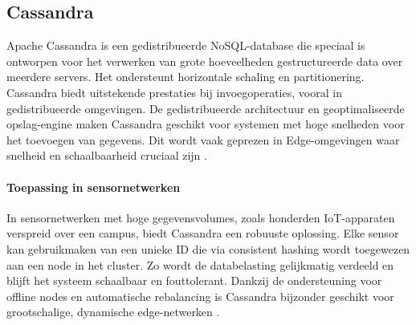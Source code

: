 \begin{table}[H]
    \centering
    \caption{Overzicht van de specificaties van PostgreSQL. \autocite{PostgreSQLDocumentation}}
\end{table}

\subsection{Cassandra}

Apache Cassandra is een gedistribueerde NoSQL-database die speciaal is ontworpen voor het verwerken van grote hoeveelheden gestructureerde data over meerdere servers. Het ondersteunt horizontale schaling en partitionering. Cassandra biedt uitstekende prestaties bij invoegoperaties, vooral in gedistribueerde omgevingen. De gedistribueerde architectuur en geoptimaliseerde opslag-engine maken Cassandra geschikt voor systemen met hoge snelheden voor het toevoegen van gegevens. Dit wordt vaak geprezen in Edge-omgevingen waar snelheid en schaalbaarheid cruciaal zijn \autocite{CassandraDocumentation}.

\paragraph{Toepassing in sensornetwerken}  
In sensornetwerken met hoge gegevensvolumes, zoals honderden IoT-apparaten verspreid over een campus, biedt Cassandra een robuuste oplossing. Elke sensor kan gebruikmaken van een unieke ID die via consistent hashing wordt toegewezen aan een node in het cluster. Zo wordt de databelasting gelijkmatig verdeeld en blijft het systeem schaalbaar en fouttolerant. Dankzij de ondersteuning voor offline nodes en automatische rebalancing is Cassandra bijzonder geschikt voor grootschalige, dynamische edge-netwerken \autocite{CassandraDocumentation, Mahmud2020}.

